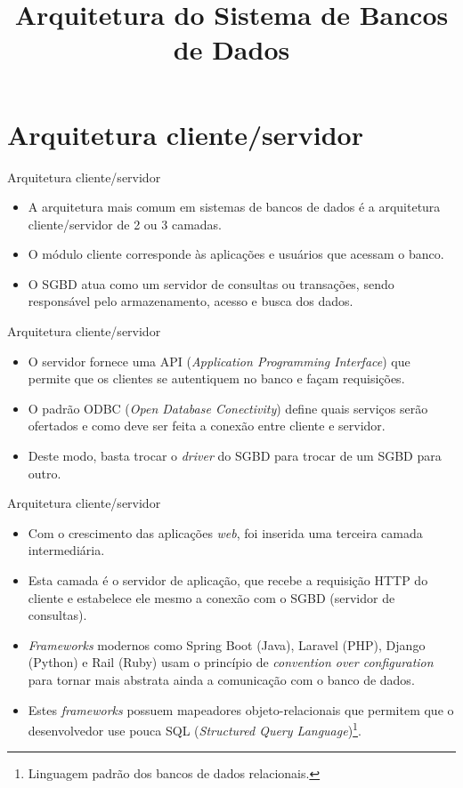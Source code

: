 \documentclass[11pt]{beamer}
\title{Arquitetura do Sistema de Bancos de Dados}
\author{}
\date{}
\begin{document}
\begin{frame}[plain]
    \titlepage
\end{frame}

\section{Arquitetura cliente/servidor}

\begin{frame}{Arquitetura cliente/servidor}
    \begin{itemize}
        \item A arquitetura mais comum em sistemas de bancos de dados é a arquitetura cliente/servidor de 2 ou 3 camadas.
        \item O módulo cliente corresponde às aplicações e usuários que acessam o banco.
        \item O SGBD atua como um servidor de consultas ou transações, sendo responsável pelo armazenamento, acesso e busca dos dados.
    \end{itemize}
\end{frame}

\begin{frame}{Arquitetura cliente/servidor}
    \begin{itemize}
        \item O servidor fornece uma API (\textit{Application Programming Interface}) que permite que os clientes se autentiquem no banco e façam requisições.
        \item O padrão ODBC (\textit{Open Database Conectivity}) define quais serviços serão ofertados e como deve ser feita a conexão entre cliente e servidor.
        \item Deste modo, basta trocar o \textit{driver} do SGBD para trocar de um SGBD para outro.
    \end{itemize}
\end{frame}

\begin{frame}{Arquitetura cliente/servidor}
    \begin{itemize}
        \item Com o crescimento das aplicações \textit{web}, foi inserida uma terceira camada intermediária.
        \item Esta camada é o servidor de aplicação, que recebe a requisição HTTP do cliente e estabelece ele mesmo a conexão com o SGBD (servidor de consultas).
        \item \textit{Frameworks} modernos como Spring Boot (Java), Laravel (PHP), Django (Python) e Rail (Ruby) usam o princípio de \textit{convention over configuration} para tornar mais abstrata ainda a comunicação com o banco de dados.
        \item Estes \textit{frameworks} possuem mapeadores objeto-relacionais que permitem que o desenvolvedor use pouca SQL (\textit{Structured Query Language})\footnote{Linguagem padrão dos bancos de dados relacionais.}.
    \end{itemize}
\end{frame}
\end{document}
